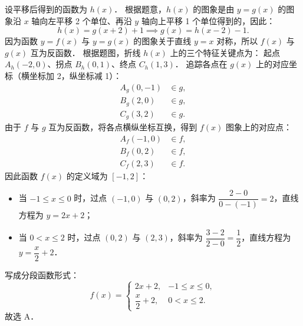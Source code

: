 \begin{answer}
设平移后得到的函数为 $h(x)$．
根据题意，$h(x)$ 的图象是由 $y = g(x)$ 的图象沿 $x$ 轴向左平移 2 个单位、再沿 $y$ 轴向上平移 1 个单位得到的，因此：
\nopagebreak[4]
\[
h(x) = g(x + 2) + 1 \implies g(x) = h(x - 2) - 1.
\]
因为函数 $y = f(x)$ 与 $y = g(x)$ 的图象关于直线 $y = x$ 对称，所以 $f(x)$ 与 $g(x)$ 互为反函数．
根据题图，折线 $h(x)$ 上的三个特征关键点为：
起点 $A_h(-2, 0)$、拐点 $B_h(0, 1)$、终点 $C_h(1, 3)$．
追踪各点在 $g(x)$ 上的对应坐标（横坐标加 2，纵坐标减 1）：
\nopagebreak[4]
\[
\begin{aligned}
A_g(0, -1) &\in g, \\
B_g(2, 0) &\in g, \\
C_g(3, 2) &\in g.
\end{aligned}
\]
由于 $f$ 与 $g$ 互为反函数，将各点横纵坐标互换，得到 $f(x)$ 图象上的对应点：
\nopagebreak[4]
\[
\begin{aligned}
A_f(-1, 0) &\in f, \\
B_f(0, 2) &\in f, \\
C_f(2, 3) &\in f.
\end{aligned}
\]
因此函数 $f(x)$ 的定义域为 $[-1, 2]$：
\begin{itemize}
\item 当 $-1 \leqslant x \leqslant 0$ 时，过点 $(-1, 0)$ 与 $(0, 2)$，斜率为 $\dfrac{2 - 0}{0 - (-1)} = 2$，直线方程为 $y = 2x + 2$；
\item 当 $0 < x \leqslant 2$ 时，过点 $(0, 2)$ 与 $(2, 3)$，斜率为 $\dfrac{3 - 2}{2 - 0} = \dfrac{1}{2}$，直线方程为 $y = \dfrac{x}{2} + 2$．
\end{itemize}

写成分段函数形式：
\nopagebreak[4]
\[
f(x) = \begin{cases}
2x + 2, & -1 \leqslant x \leqslant 0, \\
\dfrac{x}{2} + 2, & 0 < x \leqslant 2.
\end{cases}
\]
故选 A．


\end{answer}
